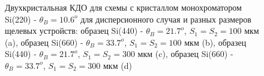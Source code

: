 \begin{figure}[H]
  \centering
  \hfill
  \hfill
  \hfill
  \caption{Двухкристальная КДО для схемы с кристаллом монохроматором Si(220) - $\theta_B = 10.6^o$
  для дисперсионного случая и разных размеров щелевых устройств:
  образец Si(440) - $\theta_B = 21.7^o$, $S_1 = S_2 = 100$ мкм (a),
   образец Si(660) - $\theta_B = 33.7^o$, $S_1 = S_2 = 100$ мкм (b),
    образец Si(440) - $\theta_B = 21.7^o$, $S_1 = S_2 = 300$ мкм (c),
     образец Si(660) - $\theta_B = 33.7^o$, $S_1 = S_2 = 300$ мкм (d)}
  \label{ris:disspersion_curves_expantheory}
\end{figure}


